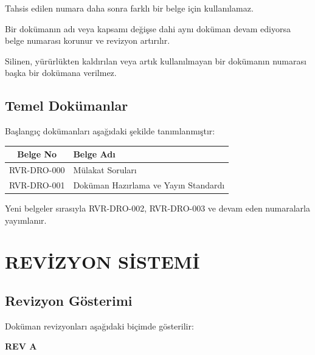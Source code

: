 \documentclass[11pt,a4paper]{article}
\begin{document}
Tahsis edilen numara daha sonra farklı bir belge için kullanılamaz.

Bir dokümanın adı veya kapsamı değişse dahi aynı doküman devam ediyorsa
belge numarası korunur ve revizyon artırılır.

\begin{dikkatkutusu}
Silinen, yürürlükten kaldırılan veya artık kullanılmayan bir dokümanın
numarası başka bir dokümana verilmez.
\end{dikkatkutusu}

\subsection{Temel Dokümanlar}

Başlangıç dokümanları aşağıdaki şekilde tanımlanmıştır:

\begin{center}

\begin{tabularx}{0.95\textwidth}{|c|X|}
\hline
\textbf{Belge No} & \textbf{Belge Adı} \\
\hline
RVR-DRO-000 & Mülakat Soruları \\
\hline
RVR-DRO-001 & Doküman Hazırlama ve Yayın Standardı \\
\hline
\end{tabularx}

\end{center}

Yeni belgeler sırasıyla RVR-DRO-002,
RVR-DRO-003 ve devam eden numaralarla yayımlanır.


\newpage

\section{REVİZYON SİSTEMİ}

\subsection{Revizyon Gösterimi}

Doküman revizyonları aşağıdaki biçimde gösterilir:

\begin{center}

\Large
\textbf{REV A}
\end{center}
\end{document}
